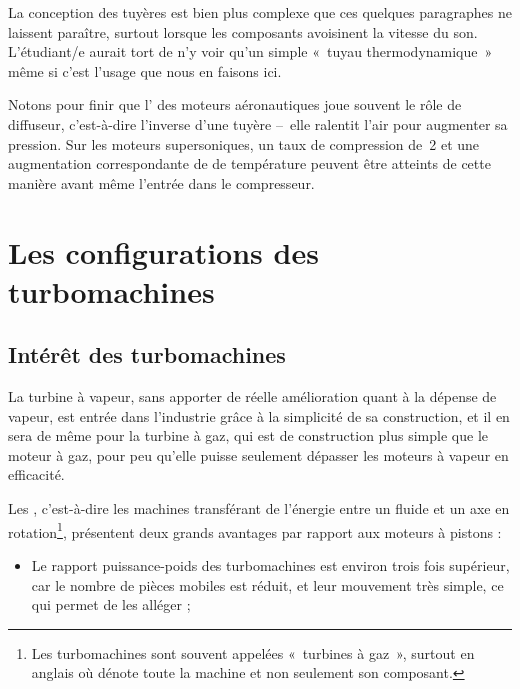 		La conception des tuyères est bien plus complexe que ces quelques paragraphes ne laissent paraître, surtout lorsque les composants avoisinent la vitesse du son. L’étudiant/e aurait tort de n’y voir qu’un simple «~tuyau thermodynamique~» même si c’est l’usage que nous en faisons ici.

		Notons pour finir que l’ des moteurs aéronautiques joue souvent le rôle de diffuseur, c’est-à-dire l’inverse d’une tuyère --\ elle ralentit l’air pour augmenter sa pression. Sur les moteurs supersoniques, un taux de compression de~2 et une augmentation correspondante de de température peuvent être atteints de cette manière avant même l’entrée dans le compresseur.


\section{Les configurations des turbomachines}
\label{ch_configurations_turbomachines}


	\subsection{Intérêt des turbomachines}

			La turbine à vapeur, sans apporter de réelle amélioration quant à la dépense de vapeur, est entrée dans l’industrie grâce à la simplicité de sa construction, et il en sera de même pour la turbine à gaz, qui est de construction plus simple que le moteur à gaz, pour peu qu’elle puisse seulement dépasser les moteurs à vapeur en efficacité.

		Les , c’est-à-dire les machines transférant de l’énergie entre un fluide et un axe en rotation\footnote{Les turbomachines sont souvent appelées «~turbines à gaz~», surtout en anglais où  dénote toute la machine et non seulement son composant.}, présentent deux grands avantages par rapport aux moteurs à pistons :

		\begin{itemize}
			\item Le rapport puissance-poids des turbomachines est environ trois fois supérieur, car le nombre de pièces mobiles est réduit, et leur mouvement très simple, ce qui permet de les alléger ;
		\end{itemize} %
		
